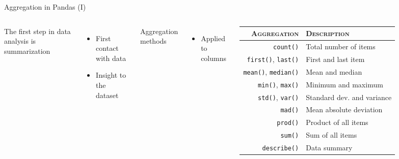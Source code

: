 \documentclass[10pt,compress]{beamer} %
\begin{document}
\begin{frame}[fragile]{Aggregation in Pandas (I)}
	\begin{columns}
		The first step in data analysis is summarization
		\begin{itemize}
			\item First contact with data
			\item Insight to the dataset
		\end{itemize}
		Aggregation methods
		\begin{itemize}
			\item Applied to columns
		\end{itemize}
	
      	\begin{tabularx}{\textwidth}{rl}
			\hline
       		\textsc{Aggregation} &  \textsc{Description}\\ \hline
       		\texttt{count()}    & 	Total number of items \\
       		\texttt{first()}, \texttt{last()} & First and last item \\
       		\texttt{mean()}, \texttt{median()} & Mean and median \\
       		\texttt{min()}, \texttt{max()} & Minimum and maximum \\
       		\texttt{std()}, \texttt{var()} & Standard dev. and variance \\
       		\texttt{mad()} & Mean absolute deviation \\
       		\texttt{prod()} & Product of all items \\
       		\texttt{sum()} & Sum of all items \\
       		\texttt{describe()} & Data summary \\\hline
    	\end{tabularx}
	\end{columns}
\end{frame}
\end{document}
